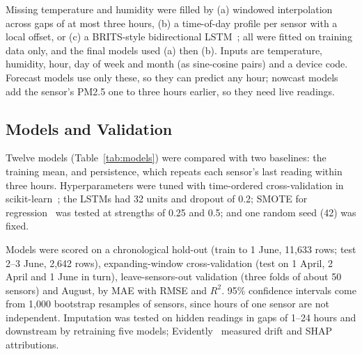 \documentclass{ieeeaccess}
\begin{document}
Missing temperature and humidity were filled by (a) windowed interpolation across gaps of at most three hours, (b) a time-of-day profile per sensor with a local offset, or (c) a BRITS-style bidirectional LSTM~\cite{ref11,ref12}; all were fitted on training data only, and the final models used (a) then (b). Inputs are temperature, humidity, hour, day of week and month (as sine-cosine pairs) and a device code. Forecast models use only these, so they can predict any hour; nowcast models add the sensor's PM2.5 one to three hours earlier, so they need live readings.

\subsection{Models and Validation}\label{sec:models-and-validation}

Twelve models (Table~\ref{tab:models}) were compared with two baselines: the training mean, and persistence, which repeats each sensor's last reading within three hours. Hyperparameters were tuned with time-ordered cross-validation in scikit-learn~\cite{ref19}; the LSTMs had 32 units and dropout of 0.2; SMOTE for regression~\cite{ref13,ref14} was tested at strengths of 0.25 and 0.5; and one random seed (42) was fixed.

Models were scored on a chronological hold-out (train to 1 June, 11,633 rows; test 2--3 June, 2,642 rows), expanding-window cross-validation (test on 1 April, 2 April and 1 June in turn), leave-sensors-out validation (three folds of about 50 sensors) and August, by MAE with RMSE and $R^2$. 95\% confidence intervals come from 1,000 bootstrap resamples of sensors, since hours of one sensor are not independent. Imputation was tested on hidden readings in gaps of 1--24 hours and downstream by retraining five models; Evidently~\cite{ref20} measured drift and SHAP~\cite{ref15,ref16} attributions.
\end{document}
